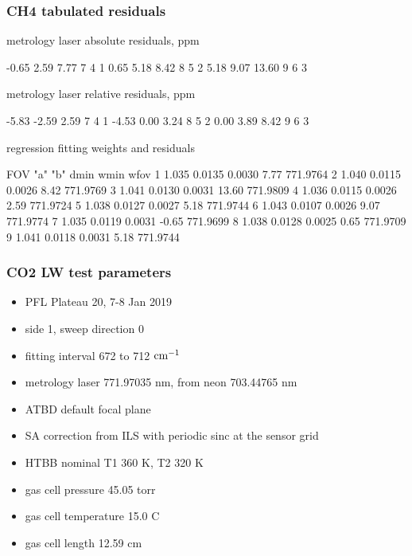 \documentclass[10pt]{beamer}
\begin{document}
\begin{frame}[fragile]
\frametitle{CH4 tabulated residuals}

  metrology laser absolute residuals, ppm
\begin{semiverbatim}\scriptsize
     -0.65     2.59     7.77         7   4   1
      0.65     5.18     8.42         8   5   2
      5.18     9.07    13.60         9   6   3
\end{semiverbatim}

  metrology laser relative residuals, ppm
\begin{semiverbatim}\scriptsize
     -5.83    -2.59     2.59         7   4   1
     -4.53     0.00     3.24         8   5   2
      0.00     3.89     8.42         9   6   3
\end{semiverbatim}

     regression fitting weights and residuals
\begin{semiverbatim}\scriptsize
 FOV   "a"       "b"     dmin     wmin      wfov
  1   1.035    0.0135   0.0030     7.77   771.9764 
  2   1.040    0.0115   0.0026     8.42   771.9769 
  3   1.041    0.0130   0.0031    13.60   771.9809 
  4   1.036    0.0115   0.0026     2.59   771.9724 
  5   1.038    0.0127   0.0027     5.18   771.9744 
  6   1.043    0.0107   0.0026     9.07   771.9774 
  7   1.035    0.0119   0.0031    -0.65   771.9699 
  8   1.038    0.0128   0.0025     0.65   771.9709 
  9   1.041    0.0118   0.0031     5.18   771.9744 
\end{semiverbatim}

\end{frame}
\begin{frame}
\frametitle{CO2 LW test parameters}

\begin{itemize}
  \item PFL Plateau 20, 7-8 Jan 2019
  \item side 1, sweep direction 0
  \item fitting interval 672 to 712 $\mbox{cm$^{-1}$}$
  \item metrology laser 771.97035 nm, from neon 703.44765 nm
  \item ATBD default focal plane
  \item SA correction from ILS with periodic sinc at the sensor grid
  \item HTBB nominal T1 360 K, T2 320 K
  \item gas cell pressure 45.05 torr
  \item gas cell temperature 15.0 C
  \item gas cell length 12.59 cm
\end{itemize}

\end{frame}
\end{document}
